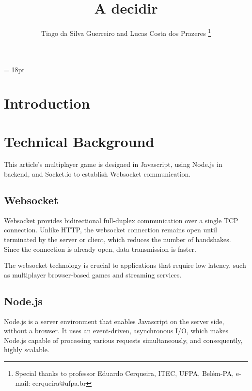 \documentclass[english]{sbrt}
\begin{document}

\title{A decidir}

\author{Tiago da Silva Guerreiro and Lucas Costa dos Prazeres
  \thanks{Special thanks to professor Eduardo Cerqueira, ITEC, UFPA, Belém-PA, e-mail: cerqueira@ufpa.br}
}

\maketitle

\baselineskip = 18pt


\begin{abstract}

\end{abstract}

\begin{keywords}

\end{keywords}

\section{\textbf{Introduction}}

\section{\textbf{Technical Background}}

This article's multiplayer game is designed in Javascript, using Node.js in backend, and Socket.io to establish Websocket communication.

\subsection{\textbf{Websocket}}
Websocket provides bidirectional full-duplex communication over a single TCP connection. Unlike HTTP, the websocket connection remains open until terminated by the server or client, which reduces the number of handshakes. Since the connection is already open, data transmission is faster.

The websocket technology is crucial to applications that require low latency, such as multiplayer browser-based games and streaming services.

\subsection{\textbf{Node.js}}
Node.js is a server environment that enables Javascript on the server side, without a browser. It uses an event-driven, asynchronous I/O, which makes Node.js capable of processing various requests simultaneously, and consequently, highly scalable.
\end{document}
